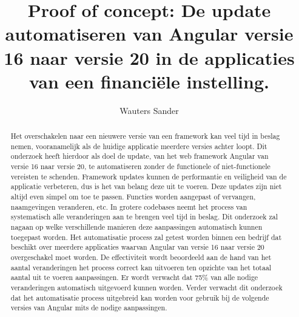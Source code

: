 \documentclass{hogent-article}
\title{Proof of concept: De update automatiseren van Angular versie 16 naar versie 20 in de applicaties van een financiële instelling.}
\author{Wauters Sander}
\begin{document}
\begin{abstract}
  Het overschakelen naar een nieuwere versie van een framework kan veel tijd in beslag nemen, vooranamelijk als de huidige applicatie meerdere versies achter loopt.
  Dit onderzoek heeft hierdoor als doel de update, van het web framework Angular van versie 16 naar versie 20, te automatiseren zonder de functionele of niet-functionele vereisten te schenden.
  Framework updates kunnen de performantie en veiligheid van de applicatie verbeteren, dus is het van belang deze uit te voeren.
  Deze updates zijn niet altijd even simpel om toe te passen.
  Functies worden aangepast of vervangen, naamgevingen veranderen, etc.
  In grotere codebases neemt het process van systematisch alle veranderingen aan te brengen veel tijd in beslag.
  Dit onderzoek zal nagaan op welke verschillende manieren deze aanpassingen automatisch kunnen toegepast worden.
  Het automatisatie process zal getest worden binnen een bedrijf dat beschikt over meerdere applicaties waarvan Angular van versie 16 naar versie 20 overgeschakel moet worden.
  De effectiviteit wordt beoordeeld aan de hand van het aantal veranderingen het process correct kan uitvoeren ten opzichte van het totaal aantal uit te voeren aanpassingen.
  Er wordt verwacht dat 75\% van alle nodige veranderingen automatisch uitgevoerd kunnen worden.
  Verder verwacht dit onderzoek dat het automatisatie process uitgebreid kan worden voor gebruik bij de volgende versies van Angular mits de nodige aanpassingen.
\end{abstract}

\tableofcontents



\printbibliography[heading=bibintoc]
\end{document}

